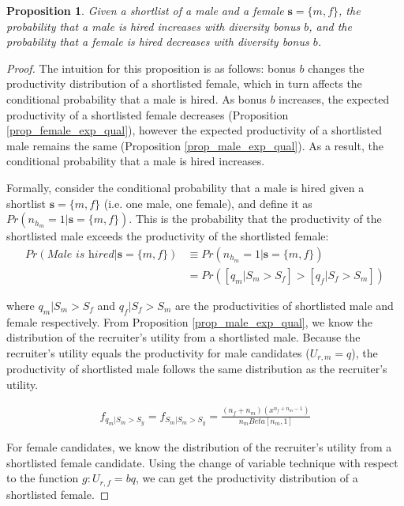 \documentclass[11pt]{article}
\newtheorem{proposition}{Proposition}
\begin{document}
\begin{proposition}
    Given a shortlist of a male and a female $\bm{s} = \{m,f\}$, the probability that a male is hired increases with diversity bonus $b$, and the probability that a female is hired decreases with diversity bonus $b$.
\end{proposition}

\begin{proof}
    The intuition for this proposition is as follows: bonus $b$ changes the productivity distribution of a shortlisted female, which in turn affects the conditional probability that a male is hired. As bonus $b$ increases, the expected productivity of a shortlisted female decreases (Proposition \ref{prop_female_exp_qual}), however the expected productivity of a shortlisted male remains the same (Proposition \ref{prop_male_exp_qual}). As a result, the conditional probability that a male is hired increases.

    Formally, consider the conditional probability that a male is hired given a shortlist $\bm{s}=\{m,f\}$ (i.e. one male, one female), and define it as $Pr(n_{h_m}=1|\bm{s}=\{m,f\})$. This is the probability that the productivity of the shortlisted male exceeds the productivity of the shortlisted female:
    \begin{align*}
        Pr(\textit{Male is hired}|\bm{s}=\{m,f\}) & \equiv Pr(n_{h_m}=1|\bm{s}=\{m,f\})     \\
                                                  & = Pr([q_m|S_m > S_f] > [q_f|S_f > S_m])
    \end{align*}

    where $q_m|S_m > S_f$ and $q_f|S_f > S_m$ are the productivities of shortlisted male and female respectively. From Proposition \ref{prop_male_exp_qual}, we know the distribution of the recruiter's utility from a shortlisted male. Because the recruiter's utility equals the productivity for male candidates ($U_{r,m} = q$), the productivity of shortlisted male follows the same distribution as the recruiter's utility.

    \begin{align*}
        f_{q_m|S_m > S_y} = f_{S_m|S_m > S_y} = \frac{(n_f+n_m)(x^{n_f+n_m-1})}{n_mBeta[n_m,1]}
    \end{align*}

    For female candidates, we know the distribution of the recruiter's utility from a shortlisted female candidate. Using the change of variable technique with respect to the function $g: U_{r,f} = bq$, we can get the productivity distribution of a shortlisted female.


\end{proof}
\end{document}
